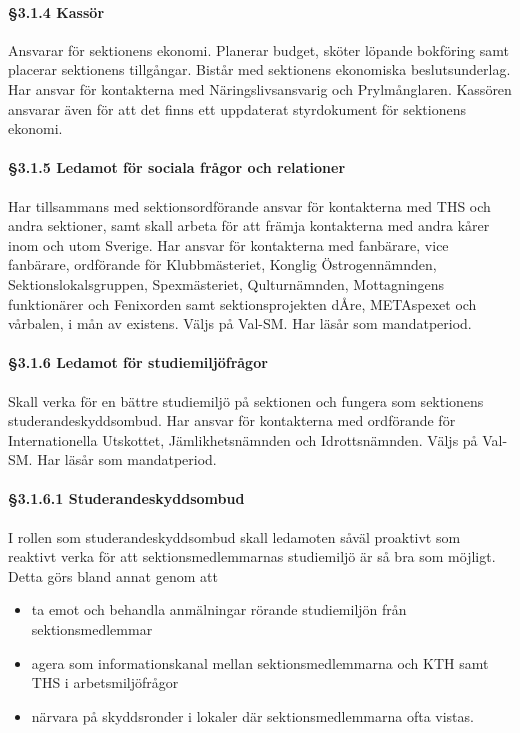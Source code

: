 \paragraph{§3.1.4 Kassör}

Ansvarar för sektionens ekonomi. Planerar budget, sköter löpande bokföring samt placerar sektionens tillgångar. Bistår med sektionens ekonomiska beslutsunderlag. Har ansvar för kontakterna med Näringslivsansvarig och Prylmånglaren. Kassören ansvarar även för att det finns ett uppdaterat styrdokument för sektionens ekonomi.

\paragraph{§3.1.5 Ledamot för sociala frågor och relationer}

Har tillsammans med sektionsordförande ansvar för kontakterna med THS och andra sektioner, samt skall arbeta för att främja kontakterna med andra kårer inom och utom Sverige. Har ansvar för kontakterna med fanbärare, vice fanbärare, ordförande för Klubbmästeriet, Konglig Östrogennämnden, Sektionslokalsgruppen, Spexmästeriet, Qulturnämnden, Mottagningens funktionärer och Fenixorden samt sektionsprojekten dÅre, METAspexet och vårbalen, i mån av existens. Väljs på Val-SM. Har läsår som mandatperiod.

\paragraph{§3.1.6 Ledamot för studiemiljöfrågor}

Skall verka för en bättre studiemiljö på sektionen och fungera som sektionens
studerandeskyddsombud. Har ansvar för kontakterna med ordförande för Internationella Utskottet, Jämlikhetsnämnden och Idrottsnämnden. Väljs på Val-SM. Har läsår som mandatperiod.

\paragraph{§3.1.6.1 Studerandeskyddsombud}

I rollen som studerandeskyddsombud skall ledamoten såväl proaktivt som reaktivt verka för att sektionsmedlemmarnas studiemiljö är så bra som möjligt. Detta görs bland annat genom att

\begin{itemize}
  \item ta emot och behandla anmälningar rörande studiemiljön från sektionsmedlemmar
  \item agera som informationskanal mellan sektionsmedlemmarna och KTH samt THS i arbetsmiljöfrågor
  \item närvara på skyddsronder i lokaler där sektionsmedlemmarna ofta vistas.
\end{itemize}

